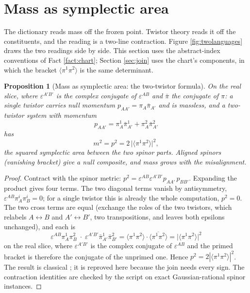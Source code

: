 \documentclass[11pt]{article}
\newtheorem{proposition}[theorem]{Proposition}
\theoremstyle{definition}
\newcommand{\br}[1]{\langle #1\rangle}
\begin{document}
\section{Mass as symplectic area}\label{sec:area}

The dictionary reads mass off the frozen point. Twistor theory reads it off the constituents, and the reading is a two-line contraction. Figure \ref{fig:twolanguages} draws the two readings side by side. This section uses the abstract-index conventions of Fact \ref{fact:chart}; Section \ref{sec:join} uses the chart's components, in which the bracket $\br{\pi^{1}\pi^{2}}$ is the same determinant.

\begin{proposition}[Mass as symplectic area: the two-twistor formula]\label{prop:area}
On the real slice, where $\varepsilon^{A'B'}$ is the complex conjugate of $\varepsilon^{AB}$ and $\bar\pi$ the conjugate of $\pi$: a single twistor carries null momentum $p_{AA'} = \pi_{A}\bar\pi_{A'}$ and is massless, and a two-twistor system with momentum
\[
p_{AA'} = \pi^{1}_{A}\bar\pi^{1}_{A'} + \pi^{2}_{A}\bar\pi^{2}_{A'}
\]
has
\begin{equation}\label{eq:area}
m^{2} = p^{2} = 2\,\bigl|\br{\pi^{1}\pi^{2}}\bigr|^{2},
\end{equation}
the squared symplectic area between the two spinor parts. Aligned spinors (vanishing bracket) give a null composite, and mass grows with the misalignment.
\end{proposition}

\begin{proof}
Contract with the spinor metric: $p^{2} = \varepsilon^{AB}\varepsilon^{A'B'} p_{AA'}\, p_{BB'}$. Expanding the product gives four terms. The two diagonal terms vanish by antisymmetry, $\varepsilon^{AB}\pi^{i}_{A}\pi^{i}_{B} = 0$; for a single twistor this is already the whole computation, $p^{2} = 0$. The two cross terms are equal (exchange the roles of the two twistors, which relabels $A \leftrightarrow B$ and $A' \leftrightarrow B'$, two transpositions, and leaves both epsilons unchanged), and each is
\[
\varepsilon^{AB}\pi^{1}_{A}\pi^{2}_{B}\;\cdot\;\varepsilon^{A'B'}\bar\pi^{1}_{A'}\bar\pi^{2}_{B'}
= \br{\pi^{1}\pi^{2}}\cdot\overline{\br{\pi^{1}\pi^{2}}}
= \bigl|\br{\pi^{1}\pi^{2}}\bigr|^{2}
\]
on the real slice, where $\varepsilon^{A'B'}$ is the complex conjugate of $\varepsilon^{AB}$ and the primed bracket is therefore the conjugate of the unprimed one. Hence $p^{2} = 2|\br{\pi^{1}\pi^{2}}|^{2}$. The result is classical \cite{Hughston1979}; it is reproved here because the join needs every sign. The contraction identities are checked by the script on exact Gaussian-rational spinor instances.
\end{proof}
\end{document}
